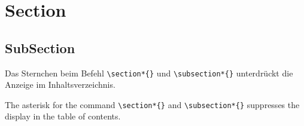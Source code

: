 \section*{Section}
\subsection*{SubSection}

Das Sternchen beim Befehl \texttt{\textbackslash{}section*\{\}} und \texttt{\textbackslash{}subsection*\{\}} unterdrückt die Anzeige im Inhaltsverzeichnis.

The asterisk for the command \texttt{\textbackslash{}section*\{\}} and \texttt{\textbackslash{}subsection*\{\}} suppresses the display in the table of contents.